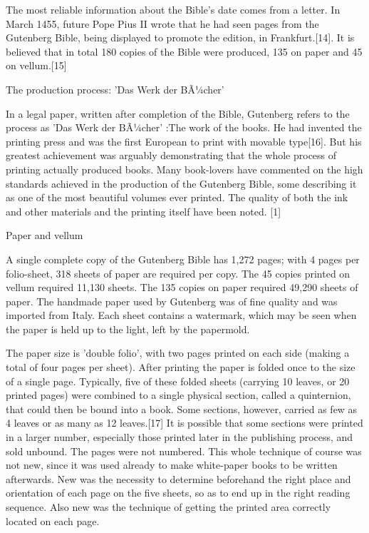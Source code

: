 {{{The most reliable information about the Bible's date comes from a letter. In March 1455, future Pope Pius II wrote that he had seen pages from the Gutenberg Bible, being displayed to promote the edition, in Frankfurt.[14].
It is believed that in total 180 copies of the Bible were produced, 135 on paper and 45 on vellum.[15]

The production process: 'Das Werk der BÃ¼cher'

In a legal paper, written after completion of the Bible, Gutenberg refers to the process as 'Das Werk der BÃ¼cher' :The work of the books. He had invented the printing press and was the first European to print with movable type[16]. But his greatest achievement was arguably demonstrating that the whole process of printing actually produced books.
Many book-lovers have commented on the high standards achieved in the production of the Gutenberg Bible, some describing it as one of the most beautiful volumes ever printed. The quality of both the ink and other materials and the printing itself have been noted. [1]

Paper and vellum

A single complete copy of the Gutenberg Bible has 1,272 pages; with 4 pages per folio-sheet, 318 sheets of paper are required per copy. The 45 copies printed on vellum required 11,130 sheets. The 135 copies on paper required 49,290 sheets of paper. The handmade paper used by Gutenberg was of fine quality and was imported from Italy. Each sheet contains a watermark, which may be seen when the paper is held up to the light, left by the papermold.

The paper size is 'double folio', with two pages printed on each side (making a total of four pages per sheet). After printing the paper is folded once to the size of a single page. Typically, five of these folded sheets (carrying 10 leaves, or 20 printed pages) were combined to a single physical section, called a quinternion, that could then be bound into a book. Some sections, however, carried as few as 4 leaves or as many as 12 leaves.[17] It is possible that some sections were printed in a larger number, especially those printed later in the publishing process, and sold unbound. The pages were not numbered. This whole technique of course was not new, since it was used already to make white-paper books to be written afterwards. New was the necessity to determine beforehand the right place and orientation of each page on the five sheets, so as to end up in the right reading sequence. Also new was the technique of getting the printed area correctly located on each page.

}}}
